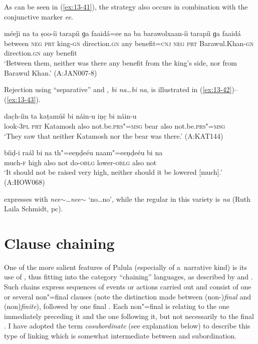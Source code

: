 As can be seen in (\ref{ex:13-41}), the strategy also occurs in combination with the conjunctive marker \textit{ee}.

\begin{exe}
\ex
\label{ex:13-41}
\gll méeǰi na ta ṣoo-íi tarapíi ɡa faaidá=ee na ba barawolxaan-íi tarapíi ɡa faaidá \\
between \textsc{neg} \textsc{prt } king-\textsc{gn} direction.\textsc{gn} any benefit=\textsc{cnj} \textsc{neg} \textsc{prt} Barawul.Khan-\textsc{gn} direction.\textsc{gn} any benefit  \\
\glt `Between them, neither was there any benefit from the king's side, nor from Barawul Khan.' (A:JAN007-8) 
\end{exe}

Rejection using ``separative''  and , \textit{bi na{\ldots}bi na}, is illustrated in (\ref{ex:13-42})--(\ref{ex:13-43}).

\begin{exe}
\ex
\label{ex:13-42}
\gll dac̣h-íin ta kaṭamúš bi náin-u iṇc̣ bi náin-u \\
look-\textsc{3pl} \textsc{prt} Katamosh also not.be.\textsc{prs"=msg} bear also not.be.\textsc{prs"=msg} \\
\glt `They saw that neither Katamosh nor the bear was there.' (A:KAT144)

\ex
\label{ex:13-43}
\gll bíiḍ-i raál bi na th"=eeṇḍeéu naam"=eeṇḍeéu bi na \\
much-\textsc{f} high also not do-\textsc{oblg} lower-\textsc{oblg} also not  \\
\glt `It should not be raised very high, neither should it be lowered [much].' (A:HOW068) 
\end{exe}

  expresses  with \textit{nee$\sim${\ldots}nee$\sim$} `no{\ldots}no', while the regular   in this variety is \textit{na} (Ruth Laila Schmidt, pc).


\section{Clause chaining}
\label{sec:13-3}

One of the more salient features of Palula  (especially of a~narrative kind) is its use of , thus fitting into the category ``chaining'' languages, as described by \citet[242]{thompsonetal2007} and \citet[374--376]{longacre2007}. Such  chains express sequences of events or actions carried out and consist of one or several non"=final clauses (note the distinction made between (non-)\textit{final} and (non)\textit{finite}), followed by one final . Each non"=final  is relating to the one immediately preceding it and the one following it, but not necessarily to the final . I have adopted the term \textit{cosubordinate} (see explanation below) to describe this type of  linking which is somewhat intermediate between  and subordination.


